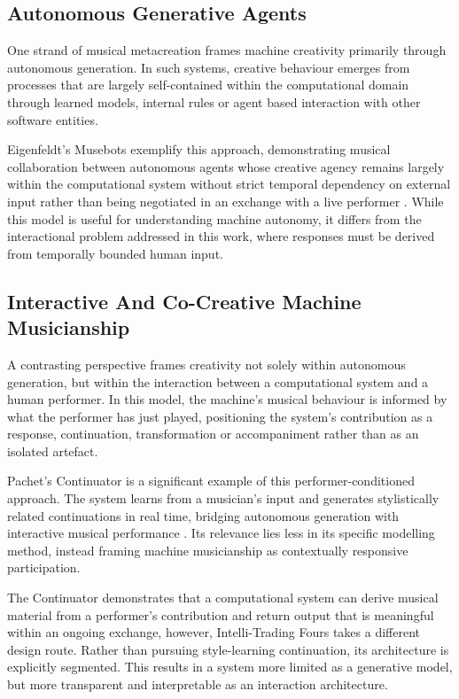 \subsection{Autonomous Generative Agents}\label{autonomous-generative-agents}

One strand of musical metacreation frames machine creativity primarily
through autonomous generation. In such systems, creative behaviour
emerges from processes that are largely self-contained within the
computational domain through learned models, internal rules or agent
based interaction with other software entities.

Eigenfeldt's Musebots exemplify this approach, demonstrating musical
collaboration between autonomous agents whose creative agency remains
largely within the computational system without strict temporal
dependency on external input rather than being negotiated in an exchange
with a live performer \citep{eigenfeldt2013musebots}. While this model is useful for
understanding machine autonomy, it differs from the interactional
problem addressed in this work, where responses must be derived from
temporally bounded human input.

\subsection{Interactive And Co-Creative Machine Musicianship}\label{interactive-and-co-creative-machine-musicianship}

A contrasting perspective frames creativity not solely within autonomous
generation, but within the interaction between a computational system
and a human performer. In this model, the machine's musical behaviour is
informed by what the performer has just played, positioning the system's
contribution as a response, continuation, transformation or
accompaniment rather than as an isolated artefact.

Pachet's Continuator is a significant example of this
performer-conditioned approach. The system learns from a musician's
input and generates stylistically related continuations in real time,
bridging autonomous generation with interactive musical performance
\citep{pachet2002continuator}. Its relevance lies less in its specific modelling
method, instead framing machine musicianship as contextually responsive
participation.

The Continuator demonstrates that a computational system can derive
musical material from a performer's contribution and return output that
is meaningful within an ongoing exchange, however, Intelli-Trading Fours
takes a different design route. Rather than pursuing style-learning
continuation, its architecture is explicitly segmented. This results in
a system more limited as a generative model, but more transparent and
interpretable as an interaction architecture.

